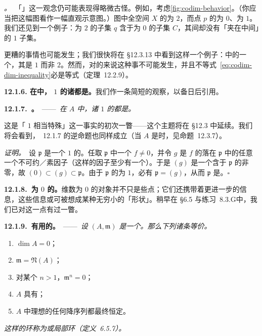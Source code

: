 \emph{\trhWarning{}。}\ 「\trCodimension」这一观念仍可能表现得略微古怪。例如，考虑\cref{fig:codim-behavior}。（你应当把这幅图看作一幅直观示意图。）图中全空间 $X$ 的\trDimension{}为 $2$，而点 $p$ 的\trDimension{}为 $0$、\trCodimension{}为 $1$。我们还见到一个例子：\trCodimension{}为 $2$ 的子集 $q$ 含于\trCodimension{}为 $0$ 的子集 $C$，其间却没有「夹在中间」的\trCodimension{} $1$ 子集。

更糟的事情也可能发生；我们很快将在 \S12.3.13 中看到这样一个例子：\trIrreducible{}\trSurface{}中的一个\trClosedPoint{}，其\trCodimension{}是 $1$ 而非 $2$。然而，对\trIrreducible{}的\trVariety{}来说这种事不可能发生，并且不等式~\eqref{eq:codim-dim-inequality}必是等式（定理~12.2.9）。

\textbf{12.1.6. 在\trUFD{}中，\trCodimension{} $1$ 的诸\trPrimeIdeal{}都是\trPrincipalIdeal。}\quad 我们作一条简短的观察，以备日后引用。

\textbf{12.1.7.\ \trhLemma{}。}\ ——\ \emph{在\trUFD{} $A$ 中，诸\trCodimension{} $1$ 的\trPrimeIdeal{}都是\trPrincipalIdeal。}

这是「\trCodimension{} $1$ 相当特殊」这一事实的初次一瞥——这个主题将在 \S12.3 中延续。我们将会看到，\trhLemma{}~12.1.7 的逆命题也同样成立（当 $A$ 是\trNoetherian{}\trIntegralDomain{}时，见命题~12.3.7）。

\emph{证明。}\ 设 $\mathfrak{p}$ 是一个\trCodimension{} $1$ 的\trPrimeIdeal。任取 $\mathfrak{p}$ 中一个 $f\neq0$，并令 $g$ 是 $f$ 的落在 $\mathfrak{p}$ 中的任意一个不可约／素因子（这样的因子至少有一个）。于是 $(g)$ 是一个含于 $\mathfrak{p}$ 的非零\trPrimeIdeal，故 $(0)\subset(g)\subset\mathfrak{p}$。由于 $\mathfrak{p}$ 的\trCodimension{}为 $1$，必有 $\mathfrak{p}=(g)$，从而 $\mathfrak{p}$ 是\trPrincipalIdeal。\hfill$\square$

\textbf{12.1.8.\ \trDimension{}为 $0$ 的\trLocalRing。}\quad 维数为 $0$ 的对象并不只是些点；它们还携带着更进一步的信息，这些信息或可被想成某种无穷小的「形状」。稍早在 \S6.5 与\mbox{练习~8.3.G}中，我们已对这一点有过一瞥。

\textbf{12.1.9.\ 有用的\trhProposition{}。}\ ——\ \emph{设 $(A,\mathfrak{m})$ 是一个\trNoetherian\trLocalRing。那么下列诸条等价。}
\begin{enumerate}[label=(\roman*)]
\item $\dim A=0$；
\item $\mathfrak{m}=\mathfrak{N}(A)$；
\item 对某个 $n>1$，$\mathfrak{m}^n=0$；
\item $A$ 具有\trFiniteLength；
\item $A$ 中理想的任何降序列都最终恒定。
\end{enumerate}
\emph{这样的环称为\trArtin{}或\trFiniteLength{}局部环（定义~6.5.7）。}

